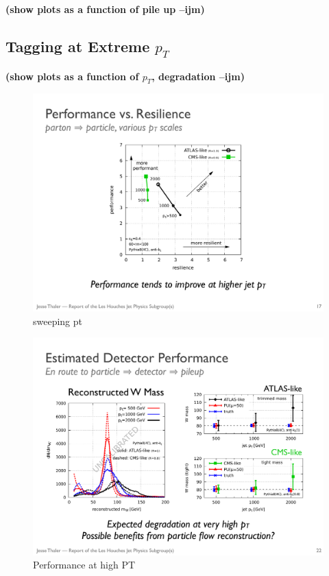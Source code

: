 \documentclass[11pt,letterpaper]{article}
\newcommand{\ijm}[1]{\textbf{\textcolor{llblue}{(#1 --ijm)}}}
\begin{document}
\ijm{show plots as a function of pile up}

\subsection{Tagging at Extreme $p_T$}\label{sec:pt_robust}

\ijm{show plots as a function of $p_T$, degradation}

\begin{figure}
\begin{center}
\includegraphics[width=0.4\columnwidth]{figures/sweep_pt}
\end{center}
\caption{sweeping pt}
\label{fig:dichroic}
\end{figure}

\begin{figure}
\begin{center}
\includegraphics[width=0.75\columnwidth]{figures/pt_degrade}
\end{center}
\caption{Performance at high PT}
\label{fig:dichroic}
\end{figure}
\end{document}
